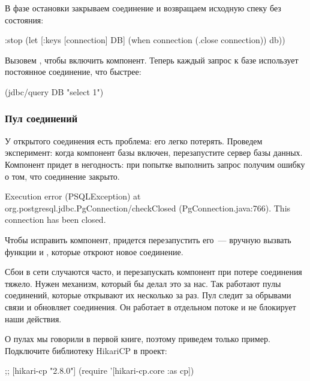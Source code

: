 В фазе остановки закрываем соединение и возвращаем исходную спеку без состояния:

\begin{english}
  \begin{clojure}
  :stop
  (let [{:keys [connection]} DB]
    (when connection
      (.close connection))
    db))
  \end{clojure}
\end{english}

Вызовем , чтобы включить компонент. Теперь каждый запрос к базе использует постоянное соединение, что быстрее:

\begin{english}
  \begin{clojure}
(jdbc/query DB "select 1")
  \end{clojure}
\end{english}

\subsubsection{Пул соединений}

У открытого соединения есть проблема: его легко потерять. Проведем эксперимент: когда компонент базы включен, перезапустите сервер базы данных. Компонент придет в негодность: при попытке выполнить запрос получим ошибку о том, что соединение закрыто.

\begin{english}
  \begin{clojure}
Execution error (PSQLException) at org.postgresql.jdbc.PgConnection/checkClosed (PgConnection.java:766).
This connection has been closed.
  \end{clojure}
\end{english}

Чтобы исправить компонент, придется перезапустить его~--- вручную вызвать функции  и , которые откроют новое соединение.

Сбои в сети случаются часто, и перезапускать компонент при потере соединения тяжело. Нужен механизм, который бы делал это за нас. Так работают пулы соединений, которые открывают их несколько за раз. Пул следит за обрывами связи и обновляет соединения. Он работает в отдельном потоке и не блокирует наши действия.

О пулах мы говорили в первой книге, поэтому приведем только пример. Подключите библиотеку HikariCP в проект:

\begin{english}
  \begin{clojure}
;; [hikari-cp "2.8.0"]
(require '[hikari-cp.core :as cp])
  \end{clojure}
\end{english}

